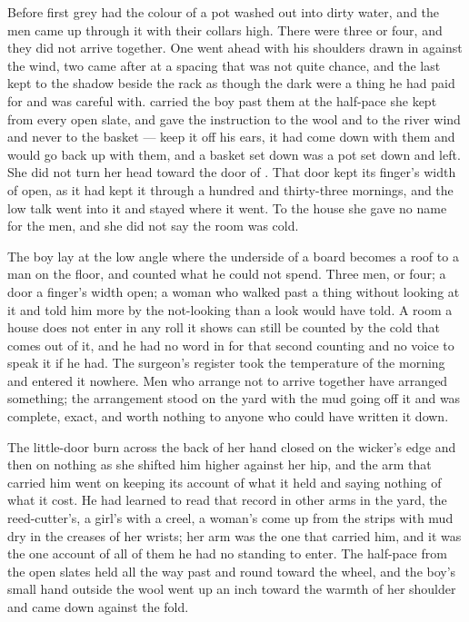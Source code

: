 
Before first grey  had the colour of a pot washed out into dirty water, and the men came up through it with their collars high. There were three or four, and they did not arrive together. One went ahead with his shoulders drawn in against the wind, two came after at a spacing that was not quite chance, and the last kept to the shadow beside the rack as though the dark were a thing he had paid for and was careful with.  carried the boy past them at the half-pace she kept from every open slate, and gave the instruction to the wool and to the river wind and never to the basket --- keep it off his ears, it had come down with them and would go back up with them, and a basket set down was a pot set down and left. She did not turn her head toward the door of . That door kept its finger's width of open, as it had kept it through a hundred and thirty-three mornings, and the low talk went into it and stayed where it went. To the house she gave no name for the men, and she did not say the room was cold.

The boy lay at the low angle where the underside of a board becomes a roof to a man on the floor, and counted what he could not spend. Three men, or four; a door a finger's width open; a woman who walked past a thing without looking at it and told him more by the not-looking than a look would have told. A room a house does not enter in any roll it shows can still be counted by the cold that comes out of it, and he had no word in  for that second counting and no voice to speak it if he had. The surgeon's register took the temperature of the morning and entered it nowhere. Men who arrange not to arrive together have arranged something; the arrangement stood on the yard with the mud going off it and was complete, exact, and worth nothing to anyone who could have written it down.

The little-door burn across the back of her hand closed on the wicker's edge and then on nothing as she shifted him higher against her hip, and the arm that carried him went on keeping its account of what it held and saying nothing of what it cost. He had learned to read that record in other arms in the yard, the reed-cutter's, a girl's with a creel, a woman's come up from the strips with mud dry in the creases of her wrists; her arm was the one that carried him, and it was the one account of all of them he had no standing to enter. The half-pace from the open slates held all the way past  and round toward the wheel, and the boy's small hand outside the wool went up an inch toward the warmth of her shoulder and came down against the fold.

